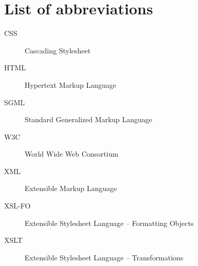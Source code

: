 \chapter{List of abbreviations}


  \begin{description}
    \item[CSS]{Cascading Stylesheet}
    \item[HTML]{Hypertext Markup Language}
    \item[SGML]{Standard Generalized Markup Language}
    \item[W3C]{World Wide Web Consortium}
    \item[XML]{Extensible Markup Language}
    \item[XSL-FO]{Extensible Stylesheet Language – Formatting Objects}
    \item[XSLT]{Extensible Stylesheet Language – Transformations}
  \end{description}